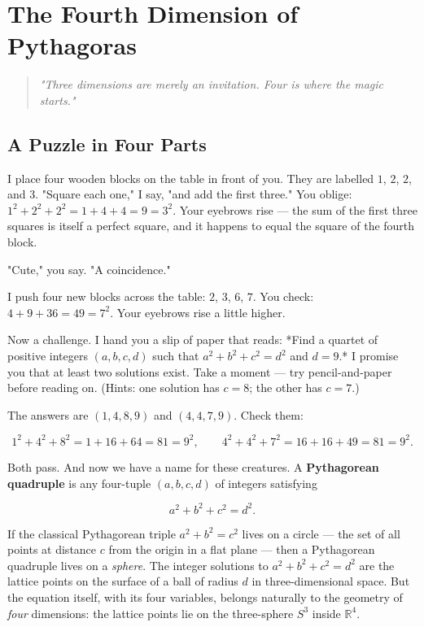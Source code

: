 \chapter{The Fourth Dimension of Pythagoras}



\ornbreak


\begin{quote}
\textit{"Three dimensions are merely an invitation. Four is where the magic starts."}
\end{quote}


\ornbreak



\section{A Puzzle in Four Parts}


I place four wooden blocks on the table in front of you. They are labelled $1$, $2$, $2$, and $3$. "Square each one," I say, "and add the first three." You oblige: $1^2 + 2^2 + 2^2 = 1 + 4 + 4 = 9 = 3^2$. Your eyebrows rise --- the sum of the first three squares is itself a perfect square, and it happens to equal the square of the fourth block.

"Cute," you say. "A coincidence."

I push four new blocks across the table: $2$, $3$, $6$, $7$. You check: $4 + 9 + 36 = 49 = 7^2$. Your eyebrows rise a little higher.

Now a challenge. I hand you a slip of paper that reads: *Find a quartet of positive integers $(a, b, c, d)$ such that $a^2 + b^2 + c^2 = d^2$ and $d = 9$.* I promise you that at least two solutions exist. Take a moment --- try pencil-and-paper before reading on. (Hints: one solution has $c = 8$; the other has $c = 7$.)

The answers are $(1, 4, 8, 9)$ and $(4, 4, 7, 9)$. Check them:

\[
1^2 + 4^2 + 8^2 = 1 + 16 + 64 = 81 = 9^2, \qquad 4^2 + 4^2 + 7^2 = 16 + 16 + 49 = 81 = 9^2.
\]

Both pass. And now we have a name for these creatures. A \textbf{Pythagorean quadruple} is any four-tuple $(a, b, c, d)$ of integers satisfying

\[
a^2 + b^2 + c^2 = d^2.
\]

If the classical Pythagorean triple $a^2 + b^2 = c^2$ lives on a circle --- the set of all points at distance $c$ from the origin in a flat plane --- then a Pythagorean quadruple lives on a \textit{sphere}. The integer solutions to $a^2 + b^2 + c^2 = d^2$ are the lattice points on the surface of a ball of radius $d$ in three-dimensional space. But the equation itself, with its four variables, belongs naturally to the geometry of \textit{four} dimensions: the lattice points lie on the three-sphere $S^3$ inside $\mathbb{R}^4$.

